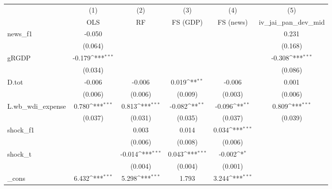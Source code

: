 {
\def\sym#1{\ifmmode^{#1}\else\(^{#1}\)\fi}
\begin{tabular}{l*{5}{c}}
\toprule
            &\multicolumn{1}{c}{(1)}&\multicolumn{1}{c}{(2)}&\multicolumn{1}{c}{(3)}&\multicolumn{1}{c}{(4)}&\multicolumn{1}{c}{(5)}\\
            &\multicolumn{1}{c}{OLS}&\multicolumn{1}{c}{RF}&\multicolumn{1}{c}{FS (GDP)}&\multicolumn{1}{c}{FS (news)}&\multicolumn{1}{c}{iv\_jai\_pan\_dev\_mid}\\
\midrule
news\_f1     &      -0.050         &                     &                     &                     &       0.231         \\
            &     (0.064)         &                     &                     &                     &     (0.168)         \\
\addlinespace
gRGDP       &      -0.179\sym{***}&                     &                     &                     &      -0.308\sym{***}\\
            &     (0.034)         &                     &                     &                     &     (0.086)         \\
\addlinespace
D.tot       &      -0.006         &      -0.006         &       0.019\sym{**} &      -0.006         &       0.001         \\
            &     (0.006)         &     (0.006)         &     (0.009)         &     (0.003)         &     (0.006)         \\
\addlinespace
L.wb\_wdi\_expense&       0.780\sym{***}&       0.813\sym{***}&      -0.082\sym{**} &      -0.096\sym{**} &       0.809\sym{***}\\
            &     (0.037)         &     (0.031)         &     (0.035)         &     (0.037)         &     (0.039)         \\
\addlinespace
shock\_f1    &                     &       0.003         &       0.014         &       0.034\sym{***}&                     \\
            &                     &     (0.006)         &     (0.008)         &     (0.006)         &                     \\
\addlinespace
shock\_t     &                     &      -0.014\sym{***}&       0.043\sym{***}&      -0.002\sym{*}  &                     \\
            &                     &     (0.004)         &     (0.004)         &     (0.001)         &                     \\
\addlinespace
\_cons      &       6.432\sym{***}&       5.298\sym{***}&       1.793         &       3.244\sym{***}&                     \\

\end{tabular}}
